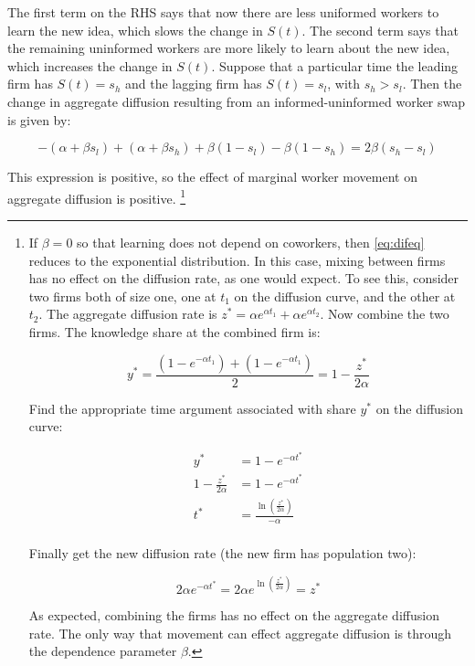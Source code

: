 The first term on the RHS says that now there are less uniformed workers to learn the new idea, which slows the change in $S(t)$.  The second term says that the remaining uninformed workers are more likely to learn about the new idea, which increases the change in $S(t)$.  Suppose that a particular time the leading firm has $S(t) = s_h$ and the lagging firm has $S(t) = s_l$, with $s_h > s_l$.  Then the change in aggregate diffusion resulting from an informed-uninformed worker swap is given by:

\begin{equation}
- \left( \alpha + \beta s_l \right) + \left( \alpha + \beta s_h \right) + \beta \left(1 - s_l\right) - \beta \left(1 - s_h\right) = 2 \beta (s_h - s_l)
\end{equation}

This expression is positive, so the effect of marginal worker movement on aggregate diffusion is positive.  \footnote{If $\beta = 0$ so that learning does not depend on coworkers, then \eqref{eq:difeq} reduces to the exponential distribution. In this case, mixing between firms has no effect on the diffusion rate, as one would expect.  To see this, consider two firms both of size one, one at $t_1$ on the diffusion curve, and the other at $t_2$.  The aggregate diffusion rate is $z^* = \alpha e^{\alpha t_1} + \alpha e^{\alpha t_2}$.  Now combine the two firms.  The knowledge share at the combined firm is:

\begin{equation} 
    y^* = \frac{(1 - e^{-\alpha t_1}) + (1 - e^{-\alpha t_1})}{2} = 1 - \frac{z^*}{2\alpha} \nonumber
\end{equation}

Find the appropriate time argument associated with share $y^*$ on the diffusion curve:

\begin{align*}
    y^* &= 1 - e^{-\alpha t^*} \\
    1 - \frac{z^*}{2\alpha} &= 1 - e^{-\alpha t^*} \\
    t^* &= \frac{\ln (\frac{z^*}{2 \alpha})}{-\alpha} \\
\end{align*}

Finally get the new diffusion rate (the new firm has population two):

\begin{equation}
    2 \alpha e^{- \alpha t^*} = 2 \alpha e^{\ln (\frac{z^*}{2 \alpha})} = z^* \nonumber
\end{equation}

As expected, combining the firms has no effect on the aggregate diffusion rate.  The only way that movement can effect aggregate diffusion is through the dependence parameter $\beta$.}

